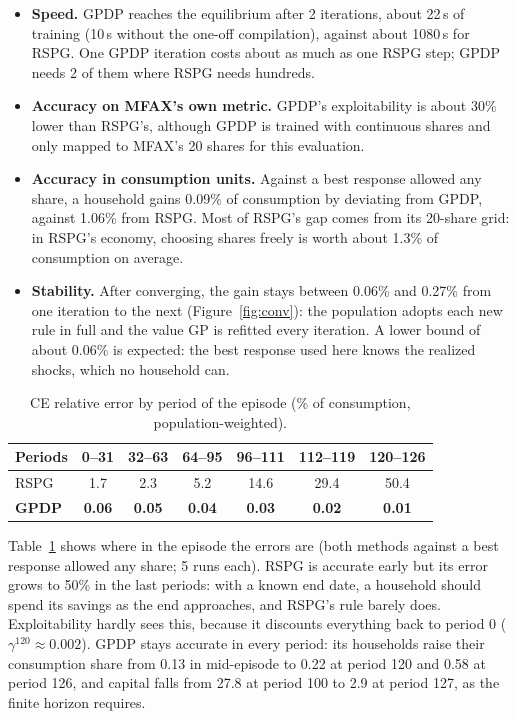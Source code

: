 \documentclass[11pt,a4paper]{article}
\begin{document}
\begin{itemize}
\item \textbf{Speed.} GPDP reaches the equilibrium after 2 iterations, about 22\,s of training (10\,s
  without the one-off compilation), against about 1080\,s for RSPG. One GPDP iteration costs about
  as much as one RSPG step; GPDP needs 2 of them where RSPG needs hundreds.
\item \textbf{Accuracy on MFAX's own metric.} GPDP's exploitability is about 30\% lower than
  RSPG's, although GPDP is trained with continuous shares and only mapped to MFAX's 20 shares for
  this evaluation.
\item \textbf{Accuracy in consumption units.} Against a best response allowed any share, a household
  gains 0.09\% of consumption by deviating from GPDP, against 1.06\% from RSPG. Most of RSPG's gap
  comes from its 20-share grid: in RSPG's economy, choosing shares freely is worth about 1.3\% of
  consumption on average.
\item \textbf{Stability.} After converging, the gain stays between 0.06\% and 0.27\% from one
  iteration to the next (Figure~\ref{fig:conv}): the population adopts each new rule in full and the
  value GP is refitted every iteration. A lower bound of about 0.06\% is expected: the best response
  used here knows the realized shocks, which no household can.
\end{itemize}

\begin{table}[h]
\centering
\small
\caption{CE relative error by period of the episode (\% of consumption, population-weighted).}
\label{tab:blocks}
\begin{tabular}{lcccccc}
\toprule
Periods & 0--31 & 32--63 & 64--95 & 96--111 & 112--119 & 120--126 \\
\midrule
RSPG          & 1.7 & 2.3 & 5.2 & 14.6 & 29.4 & 50.4 \\
\textbf{GPDP} & \textbf{0.06} & \textbf{0.05} & \textbf{0.04} & \textbf{0.03} & \textbf{0.02} & \textbf{0.01} \\
\bottomrule
\end{tabular}
\end{table}

Table~\ref{tab:blocks} shows where in the episode the errors are (both methods against a best
response allowed any share; 5 runs each). RSPG is accurate early but its error grows to 50\% in the
last periods: with a known end date, a household should spend its savings as the end approaches,
and RSPG's rule barely does. Exploitability hardly sees this, because it discounts everything back
to period 0 ($\gamma^{120} \approx 0.002$). GPDP stays accurate in every period: its households raise
their consumption share from 0.13 in mid-episode to 0.22 at period 120 and 0.58 at period 126, and
capital falls from 27.8 at period 100 to 2.9 at period 127, as the finite horizon requires.
\end{document}
